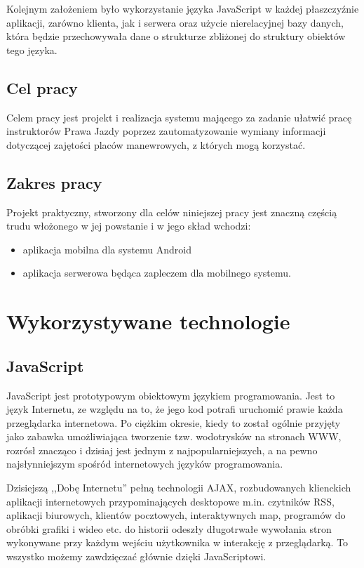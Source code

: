 \documentclass[twoside,a4paper,openright,12pt]{book}
\begin{document}
Kolejnym założeniem było wykorzystanie języka JavaScript w każdej płaszczyźnie aplikacji, zarówno klienta, jak i serwera oraz użycie nierelacyjnej bazy danych, która będzie przechowywała dane o strukturze zbliżonej do struktury obiektów tego języka.


\section{Cel pracy}

Celem pracy jest projekt i realizacja systemu mającego za zadanie ułatwić pracę instruktorów Prawa Jazdy poprzez zautomatyzowanie wymiany informacji dotyczącej zajętości placów manewrowych, z których mogą korzystać.


\section{Zakres pracy}

Projekt praktyczny, stworzony dla celów niniejszej pracy jest znaczną częścią trudu włożonego w jej powstanie i w jego skład wchodzi:

\begin{itemize}
	\item aplikacja mobilna dla systemu Android
	\item aplikacja serwerowa będąca zapleczem dla mobilnego systemu.
\end{itemize}




\chapter{Wykorzystywane technologie}

\section{JavaScript}

JavaScript jest prototypowym obiektowym językiem programowania. Jest to język Internetu, ze względu na to, że jego kod potrafi uruchomić prawie każda przeglądarka internetowa. Po ciężkim okresie, kiedy to został ogólnie przyjęty jako zabawka umożliwiająca tworzenie tzw. wodotrysków na stronach WWW, rozrósł znacząco i dzisiaj jest jednym z najpopularniejszych, a na pewno najsłynniejszym spośród internetowych języków programowania.

Dzisiejszą ,,Dobę Internetu'' pełną technologii AJAX, rozbudowanych klienckich aplikacji internetowych przypominających desktopowe m.in. czytników RSS, aplikacji biurowych, klientów pocztowych, interaktywnych map, programów do obróbki grafiki i wideo etc. do historii odeszły długotrwałe wywołania stron wykonywane przy każdym wejściu użytkownika  w interakcję z przeglądarką. To wszystko możemy zawdzięczać głównie dzięki JavaScriptowi.
\end{document}
